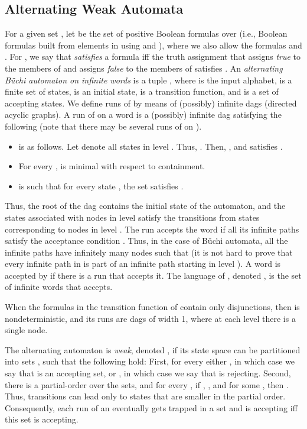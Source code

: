 \documentclass{llncs}
\begin{document}
\subsection{Alternating Weak Automata}

For a given set , let  be the set of positive Boolean formulas over  (i.e., Boolean formulas built from elements in 
using  and ), where we also allow the formulas  and . For , we say that  {\em satisfies\/} a
formula  iff the truth assignment that assigns {\em true} to the members of  and assigns {\em false} to the
members of  satisfies .
An {\em alternating B\"uchi automaton on infinite words\/} is a tuple
, where 
is the input alphabet,  is a finite set of states,  is an initial state, 
is a transition function, and  is a set of accepting states. We define runs of  by means of (possibly) infinite {\sc dag}s
(directed acyclic graphs).  A run of  on a word
 is a (possibly) infinite {\sc dag}   satisfying the following (note that there may be several runs
of  on ).
\begin{itemize}
\item
 is as follows. Let  denote
 all states
 in level . Thus, . Then,
, and  satisfies .
\item For every ,  is minimal with respect to containment.
\item
 is such that for every state , the set  satisfies .
\end{itemize}
Thus, the root of the {\sc dag} contains the initial state of the automaton, and the states associated with nodes in level  satisfy the
transitions from states corresponding to nodes in level .
The run  accepts the word  if all its infinite paths satisfy the acceptance condition . Thus, in the case of B\"uchi automata,
all the infinite paths have infinitely many nodes  such that 
(it is not hard to prove that every infinite path in  is part of an infinite path starting in level ).
A word  is accepted by  if there is a run that accepts it. The language of ,
denoted , is the set of infinite words that  accepts.

When the formulas in the transition function of  contain only disjunctions, then  is  nondeterministic, and its runs are {\sc dag}s of width 1, where at each level there is a single node. 

The alternating automaton  is {\em weak\/}, denoted , if its state space  can be partitioned into sets , such that the following hold: First, for every  either , in which case we say that  is an accepting set,  or , in which case we say that  is rejecting. Second, there is a partial-order  over the sets, and for every , if , , and  for some , then . Thus, transitions can lead only to states that are smaller in the partial order. Consequently, each run of an  eventually gets trapped in a set  and is accepting iff this set is accepting. 
\end{document}
